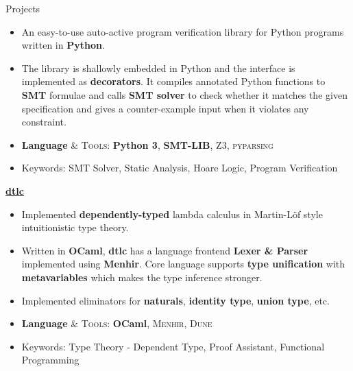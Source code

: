 \documentclass{resume}
\newcommand{\myul}[2][blue]{\setulcolor{#1}\ul{#2}\setulcolor{blue}}
\begin{document}
\begin{rSection}{Projects}
		\begin{itemize}
			\setlength{\itemsep}{1pt}
            \setlength{\parskip}{0pt}
			\setlength{\parsep}{0pt}
			\item An easy-to-use auto-active program verification library for Python programs written in \textbf{Python}.
			\item The library is shallowly embedded in Python and the interface is implemented as \textbf{decorators}. It compiles annotated Python functions to \textbf{SMT} formulae and calls \textbf{SMT solver} to check whether it matches the given specification and gives a counter-example input when it violates any constraint.
			\item \textbf{Language} \& \textsc{Tools}: \textbf{Python 3}, \textbf{SMT-LIB}, \textsc{Z3}, \textsc{pyparsing}
			\item Keywords: SMT Solver, Static Analysis, Hoare Logic, Program Verification
		\end{itemize}

		\textbf{\href{https://github.com/AD1024/dtlc}{\color{blue} \myul{dtlc}}} %
		\vspace{-5pt}

		\begin{itemize}
			\setlength{\itemsep}{1pt}
            \setlength{\parskip}{0pt}
			\setlength{\parsep}{0pt}
			\item Implemented \textbf{dependently-typed} lambda calculus in Martin-Löf style intuitionistic type theory.
			\item Written in \textbf{OCaml}, \textbf{dtlc} has a language frontend \textbf{Lexer \& Parser} implemented using \textbf{Menhir}. Core language supports \textbf{type unification} with \textbf{metavariables} which makes the type inference stronger.
			\item Implemented eliminators for \textbf{naturals}, \textbf{identity type}, \textbf{union type}, etc.
			\item \textbf{Language} \& \textsc{Tools}: \textbf{OCaml}, \textsc{Menhir}, \textsc{Dune}
			\item Keywords: Type Theory - Dependent Type, Proof Assistant, Functional Programming
		\end{itemize}
    \end{rSection}
\end{document}
